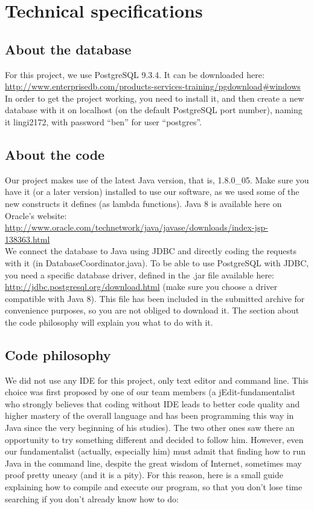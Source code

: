 \documentclass[a4paper ,12pt,french]{article}
\begin{document}
\section{Technical specifications }

\subsection{About the database}

For this project, we use PostgreSQL 9.3.4. It can be downloaded here: \url{http://www.enterprisedb.com/products-services-training/pgdownload#windows}
In order to get the project working, you need to install it, and then create a new database with it on localhost (on the default PostgreSQL port number), naming it lingi2172, with password “ben” for user “postgres”.


\subsection{About the code}
Our project makes use of the latest Java version, that is, 1.8.0\_05. Make sure you have it (or a later version) installed to use our software, as we used some of the new constructs it defines (as lambda functions). Java 8 is available here on Oracle’s website: 
\url{http://www.oracle.com/technetwork/java/javase/downloads/index-jsp-138363.html }\\


We connect the database to Java using JDBC and directly coding the requests with it (in DatabaseCoordinator.java). To be able to use PostgreSQL with JDBC, you need a specific database driver, defined in the .jar file available here: 
\url{http://jdbc.postgresql.org/download.html} (make sure you choose a driver compatible with Java 8). This file has been included in the submitted archive for convenience purposes, so you are not obliged to download it. The section about the code philosophy will explain you what to do with it.

\subsection{Code philosophy}

We did not use any IDE for this project, only text editor and command line. This choice was first proposed by one of our team members (a jEdit-fundamentalist who strongly believes that coding without IDE leads to better code quality and higher mastery of the overall language and has been programming this way in Java since the very beginning of his studies). The two other ones saw there an opportunity to try something different and decided to follow him. 
However, even our fundamentalist (actually, especially him) must admit that finding how to run Java in the command line, despite the great wisdom of Internet, sometimes may proof pretty uneasy (and it is a pity). For this reason, here is a small guide explaining how to compile and execute our program, so that you don’t lose time searching if you don’t already know how to do:
\end{document}
